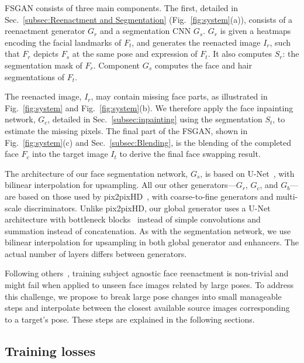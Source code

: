 FSGAN consists of three main components. The first, detailed in Sec.~\ref{subsec:Reenactment and Segmentation} (Fig.~\ref{fig:system}(a)), consists of a reenactment generator $G_r$ and a segmentation CNN $G_s$. $G_r$ is given a heatmaps encoding the facial landmarks of $F_{t}$, and generates the reenacted image ${I}_{r}$, such that $F_{r}$ depicts $F_{s}$ at the same pose and expression of $F_{t}$. It also computes
$S_{r}$: the segmentation mask of $F_{r}$. Component $G_s$
computes the face and hair segmentations of $F_{t}$.

The reenacted image, $I_r$, may contain missing face
parts, as illustrated in Fig.~\ref{fig:system} and Fig.~\ref{fig:system}(b). We therefore
apply the face inpainting network, $G_c$, detailed in Sec.~\ref{subsec:inpainting}
using the segmentation $S_{t}$, to estimate the missing pixels. The final part of the FSGAN, shown in Fig.~\ref{fig:system}(c) and Sec.~\ref{subsec:Blending}, is the blending of the completed face $F_{c}$ into the target image $I_{t}$ to derive the final face swapping result. 

The architecture of our face segmentation network, $G_{s}$, is based on U-Net~\cite{ronneberger2015u}, with bilinear interpolation for upsampling. All our other generators---$G_{r}$, $G_{c}$, and $G_{b}$---are based on those used by pix2pixHD~\cite{wang2018pix2pixHD}, with coarse-to-fine generators and multi-scale discriminators. Unlike pix2pixHD, our global generator uses a U-Net architecture with bottleneck blocks~\cite{he2016deep} instead of simple convolutions and summation instead of concatenation. As with the segmentation network, we use bilinear interpolation for upsampling in both global generator and enhancers. The actual number of layers differs between generators. %

Following others~\cite{wayne2018reenactgan}, training subject agnostic face reenactment is non-trivial and might fail when applied to unseen face images related by large poses. To address this challenge, we propose to break large pose changes into
small manageable steps and interpolate between the closest available source images corresponding to a target's pose. These steps are explained in the following sections. 

\subsection{Training losses}

